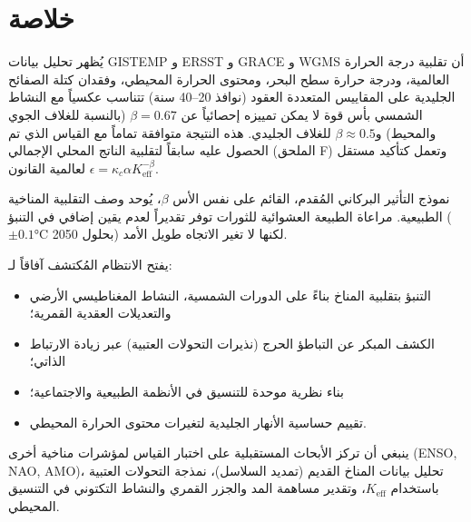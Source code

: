 \documentclass[11pt,a4paper]{article}
\newcommand{\Keff}{K_{\mathrm{eff}}}
\newcommand{\kappac}{\kappa_c}
\newcommand{\be}{\beta}
\begin{document}
	\section{خلاصة}
	
	يُظهر تحليل بيانات GISTEMP و ERSST و GRACE و WGMS أن تقلبية درجة الحرارة العالمية، ودرجة حرارة سطح البحر، ومحتوى الحرارة المحيطي، وفقدان كتلة الصفائح الجليدية على المقاييس المتعددة العقود (نوافذ 20–40 سنة) تتناسب عكسياً مع النشاط الشمسي بأس قوة لا يمكن تمييزه إحصائياً عن \(\be = 0.67\) (بالنسبة للغلاف الجوي والمحيط) و\(\be \approx 0.5\) للغلاف الجليدي. هذه النتيجة متوافقة تماماً مع القياس الذي تم الحصول عليه سابقاً لتقلبية الناتج المحلي الإجمالي (الملحق F) وتعمل كتأكيد مستقل لعالمية القانون \(\epsilon = \kappac \alpha \Keff^{-\be}\).
	
	نموذج التأثير البركاني المُقدم، القائم على نفس الأس \(\beta\)، يُوحد وصف التقلبية المناخية الطبيعية. مراعاة الطبيعة العشوائية للثورات توفر تقديراً لعدم يقين إضافي في التنبؤ (\(\pm0.1\)°C بحلول 2050) لكنها لا تغير الاتجاه طويل الأمد.
	
	يفتح الانتظام المُكتشف آفاقاً لـ:
	\begin{itemize}
		\item التنبؤ بتقلبية المناخ بناءً على الدورات الشمسية، النشاط المغناطيسي الأرضي والتعديلات العقدية القمرية؛
		\item الكشف المبكر عن التباطؤ الحرج (نذيرات التحولات العتبية) عبر زيادة الارتباط الذاتي؛
		\item بناء نظرية موحدة للتنسيق في الأنظمة الطبيعية والاجتماعية؛
		\item تقييم حساسية الأنهار الجليدية لتغيرات محتوى الحرارة المحيطي.
	\end{itemize}
	
	ينبغي أن تركز الأبحاث المستقبلية على اختبار القياس لمؤشرات مناخية أخرى (ENSO, NAO, AMO)، تحليل بيانات المناخ القديم (تمديد السلاسل)، نمذجة التحولات العتبية باستخدام \(\Keff\)، وتقدير مساهمة المد والجزر القمري والنشاط التكتوني في التنسيق المحيطي.
	
\end{document}
